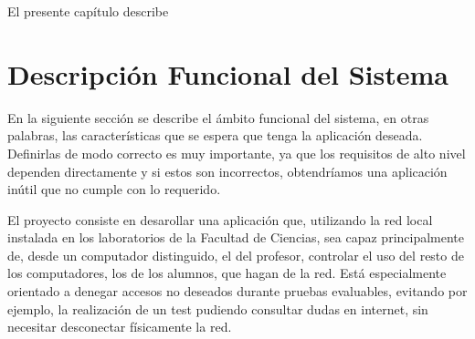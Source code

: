 

\label{chap:planificacion}


El presente cap\'itulo describe 

\chaptertoc

\section{Descripción Funcional del Sistema}
\label{sec:planificacion:descFuncional}



En la siguiente sección se describe el ámbito funcional del sistema, en otras palabras, las características que se espera que tenga la aplicación deseada. Definirlas de modo correcto es muy importante, ya que los requisitos de alto nivel dependen directamente y si estos son incorrectos, obtendríamos una aplicación inútil que no cumple con lo requerido.
\newline

El proyecto consiste en desarollar una aplicación que, utilizando la red local instalada en los laboratorios de la Facultad de Ciencias, sea capaz principalmente de, desde un computador distinguido, el del profesor, controlar el uso del resto de los computadores, los de los alumnos, que hagan de la red. Está especialmente orientado a denegar accesos no deseados durante pruebas evaluables, evitando por ejemplo, la realización de un test pudiendo consultar dudas en internet, sin necesitar desconectar físicamente la red. 
\newline

